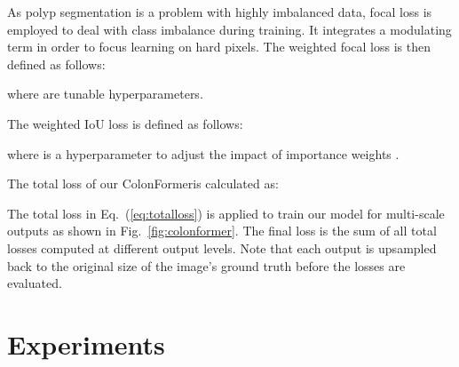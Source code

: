 \documentclass{article}
\newcommand{\ModelName}{ColonFormer}
\begin{document}
{As polyp segmentation is a problem with highly imbalanced data, focal loss is employed to deal with class imbalance during training. It integrates a modulating term in order to focus learning on hard pixels. The weighted focal loss is then defined as follows:

where  are tunable hyperparameters.


The weighted IoU loss is defined as follows:

where  is a hyperparameter to adjust the impact of importance weights .

The total loss of our \ModelName is calculated as: 


The total loss in Eq.~(\ref{eq:totalloss}) is applied to train our model for multi-scale outputs as shown in Fig.~\ref{fig:colonformer}. The final loss is the sum of all total losses computed at different output levels. Note that each output is upsampled back to the original size of the image's ground truth before the losses are evaluated.



\section{Experiments}
\label{sec:experiment}

}
\end{document}
